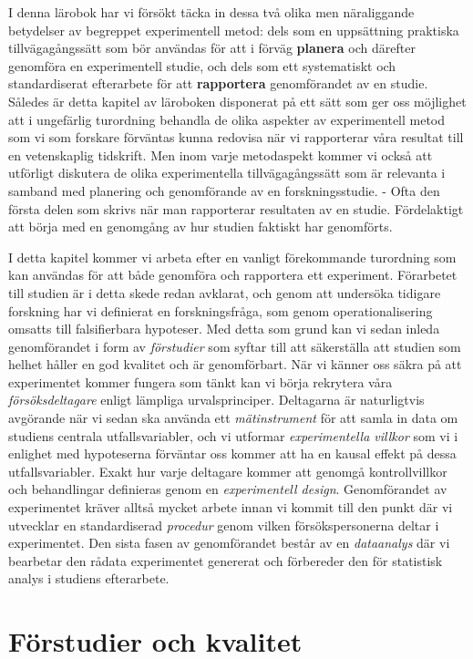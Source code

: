 \documentclass[
]{book}
\begin{document}
I denna lärobok har vi försökt täcka in dessa två olika men näraliggande betydelser av begreppet experimentell metod: dels som en uppsättning praktiska tillvägagångssätt som bör användas för att i förväg \textbf{planera} och därefter genomföra en experimentell studie, och dels som ett systematiskt och standardiserat efterarbete för att \textbf{rapportera} genomförandet av en studie. Således är detta kapitel av läroboken disponerat på ett sätt som ger oss möjlighet att i ungefärlig turordning behandla de olika aspekter av experimentell metod som vi som forskare förväntas kunna redovisa när vi rapporterar våra resultat till en vetenskaplig tidskrift. Men inom varje metodaspekt kommer vi också att utförligt diskutera de olika experimentella tillvägagångssätt som är relevanta i samband med planering och genomförande av en forskningsstudie. - Ofta den första delen som skrivs när man rapporterar resultaten av en studie. Fördelaktigt att börja med en genomgång av hur studien faktiskt har genomförts.

I detta kapitel kommer vi arbeta efter en vanligt förekommande turordning som kan användas för att både genomföra och rapportera ett experiment. Förarbetet till studien är i detta skede redan avklarat, och genom att undersöka tidigare forskning har vi definierat en forskningsfråga, som genom operationalisering omsatts till falsifierbara hypoteser. Med detta som grund kan vi sedan inleda genomförandet i form av \emph{förstudier} som syftar till att säkerställa att studien som helhet håller en god kvalitet och är genomförbart. När vi känner oss säkra på att experimentet kommer fungera som tänkt kan vi börja rekrytera våra \emph{försöksdeltagare} enligt lämpliga urvalsprinciper. Deltagarna är naturligtvis avgörande när vi sedan ska använda ett \emph{mätinstrument} för att samla in data om studiens centrala utfallsvariabler, och vi utformar \emph{experimentella villkor} som vi i enlighet med hypoteserna förväntar oss kommer att ha en kausal effekt på dessa utfallsvariabler. Exakt hur varje deltagare kommer att genomgå kontrollvillkor och behandlingar definieras genom en \emph{experimentell design}. Genomförandet av experimentet kräver alltså mycket arbete innan vi kommit till den punkt där vi utvecklar en standardiserad \emph{procedur} genom vilken försökspersonerna deltar i experimentet. Den sista fasen av genomförandet består av en \emph{dataanalys} där vi bearbetar den rådata experimentet genererat och förbereder den för statistisk analys i studiens efterarbete.

\hypertarget{sec07.1}{%
\section{Förstudier och kvalitet}\label{sec07.1}}
\end{document}
